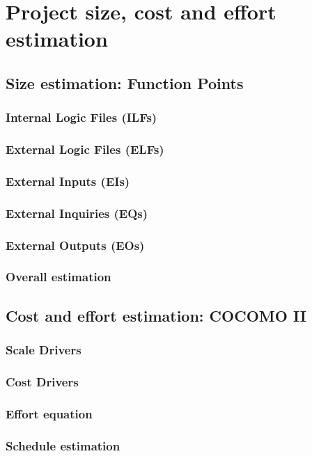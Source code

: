 \section{Project size, cost and effort estimation}

\subsection{Size estimation: Function Points}

\subsubsection{Internal Logic Files (ILFs)}

\subsubsection{External Logic Files (ELFs)}

\subsubsection{External Inputs (EIs)}

\subsubsection{External Inquiries (EQs)}
 
\subsubsection{External Outputs (EOs)} 

\subsubsection{Overall estimation}

\subsection{Cost and effort estimation: COCOMO II} 

\subsubsection{Scale Drivers}

\subsubsection{Cost Drivers}

\subsubsection{Effort equation}

\subsubsection{Schedule estimation }